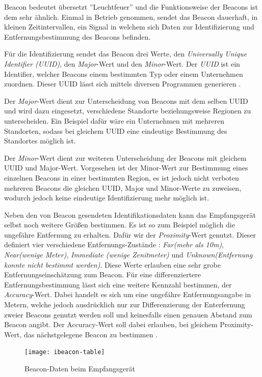 Beacon bedeutet übersetzt ''Leuchtfeuer'' und die Funktionsweise der Beacons ist dem sehr ähnlich.
Einmal in Betrieb genommen, sendet das Beacon dauerhaft, in kleinen Zeitintervallen, ein Signal in welchem sich Daten zur Identifizierung und Entfernungsbestimmung des Beacons befinden.

Für die Identifizierung sendet das Beacon drei Werte, den \emph{Universally Unique Identifier (UUID)}, den \emph{Major}-Wert und den \emph{Minor}-Wert.
Der \emph{UUID} ist ein Identifier, welcher Beacons einem bestimmten Typ oder einem Unternehmen zuordnen. Dieser UUID lässt sich mittels diversen Programmen generieren \cite{uuidgen}.

Der \emph{Major}-Wert dient zur Unterscheidung von Beacons mit dem selben UUID und wird dazu eingesetzt, verschiedene Standorte beziehungsweise Regionen zu unterscheiden. Ein Beispiel dafür wäre ein Unternehmen mit mehreren Standorten, sodass bei gleichem UUID eine eindeutige Bestimmung des Standortes möglich ist.

Der \emph{Minor}-Wert dient zur weiteren Unterscheidung der Beacons mit gleichem UUID und Major-Wert. Vorgesehen ist der Minor-Wert zur Bestimmung eines einzelnen Beacons in einer bestimmten Region, es ist jedoch nicht verboten mehreren Beacons die gleichen UUID, Major und Minor-Werte zu zuweisen, wodurch jedoch keine eindeutige Identifizierung mehr möglich ist. 

Neben den von Beacon gesendeten Identifikationsdaten kann das Empfangsgerät selbst noch weitere Größen bestimmen. Es ist so zum Beispiel möglich die ungefähre Entfernung zu erhalten. 
Dafür wir der \emph{Proximity}-Wert genutzt. Dieser definiert vier verschiedene Entfernungs-Zustände : \textit{Far(mehr als 10m)}, \textit{Near(wenige Meter)}, \textit{Immediate (wenige Zenitmeter)} und \textit{Unknown(Entfernung konnte nicht bestimmt werden)}. 
Diese Werte erlauben eine sehr grobe Entfernungseinschätzung zum Beacon. 
Für eine differenziertere Entfernungsbestimmung lässt sich eine weitere Kennzahl bestimmen, der \textit{Accuracy}-Wert. Dabei handelt es sich um eine ungefähre Entfernungsangabe in Metern, welche jedoch ausdrücklich nur zur Differenzierung der Enterfernung zweier Beacons genutzt werden soll und keinesfalls einen genauen Abstand zum Beacon angibt. Der Accuracy-Wert soll dabei erlauben, bei gleichem Proximity-Wert, das nächstgelegene Beacon zu bestimmen \cite{clbeaconref}.

\begin{figure}[htb!]
		\centering
	\texttt{[image: ibeacon-table]}
	\caption{Beacon-Daten beim Empfangsgerät}
	\label{ibeacon-table}
\end{figure}


